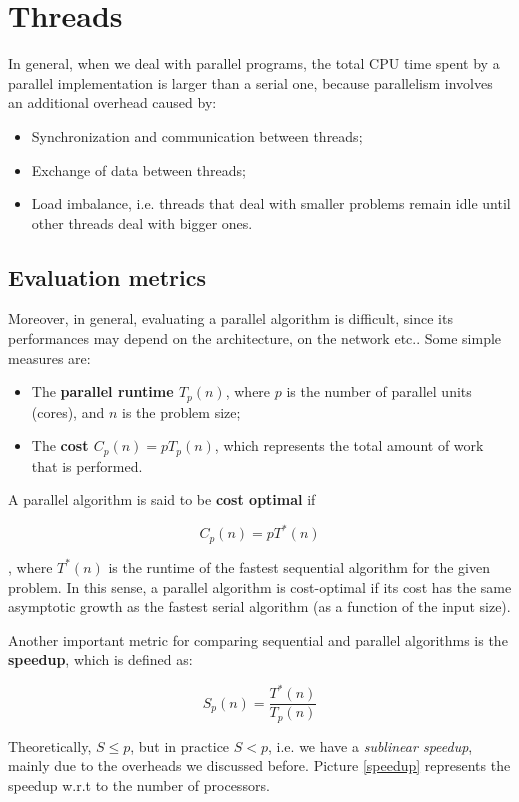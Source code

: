 \section{Threads}\label{ch3}
In general, when we deal with parallel programs, the total CPU time spent by a parallel implementation is larger than a serial one, because parallelism involves an additional overhead caused by:

\begin{itemize}
    \item Synchronization and communication between threads;
    \item Exchange of data between threads;
    \item Load imbalance, i.e. threads that deal with smaller problems remain idle until other threads deal with bigger ones.
\end{itemize}

\subsection{Evaluation metrics}

Moreover, in general, evaluating a parallel algorithm is difficult, since its performances may depend on the architecture, on the network etc.. Some simple measures are:

\begin{itemize}
    \item The \textbf{parallel runtime $T_p(n)$}, where $p$ is the number of parallel units (cores), and $n$ is the problem size;
    \item The \textbf{cost $C_p(n) = pT_p(n)$}, which represents the total amount of work that is performed.
\end{itemize}

A parallel algorithm is said to be \textbf{cost optimal} if 

$$
C_p(n) = p T^*(n)
$$

, where $T^*(n)$ is the runtime of the fastest sequential algorithm for the given problem. In this sense, a parallel algorithm is cost-optimal if its cost has the same asymptotic growth as the fastest serial algorithm (as a function of the input size).

Another important metric for comparing sequential and parallel algorithms is the \textbf{speedup}, which is defined as:

$$
S_p(n) = \frac{T^*(n)}{T_p(n)}
$$

Theoretically, $S \leq p$, but in practice $S < p$, i.e. we have a \textit{sublinear speedup}, mainly due to the overheads we discussed before. Picture \ref{speedup} represents the speedup w.r.t to the number of processors.

